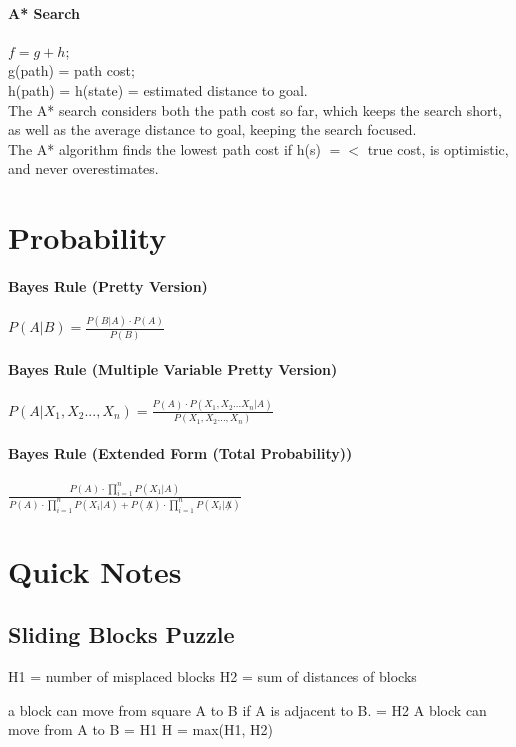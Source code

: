 \documentclass[11pt,letterpaper]{article}
\begin{document}
\paragraph{A* Search}
$f = g + h$; \\ 
g(path) = path cost; \\
h(path) = h(state) = estimated distance to goal. \\
The A* search considers both the path cost so far, which keeps the search short, as well as the average distance to goal, keeping the search focused. \\
The A* algorithm finds the lowest path cost if h(s) $=<$ true cost, is optimistic, and never overestimates.



\section{Probability}

\paragraph{Bayes Rule (Pretty Version)}
$P(A|B) = \frac{P(B|A)\cdot P(A)}{P(B)}$

\paragraph{Bayes Rule (Multiple Variable Pretty Version)}
$ P(A|X_{1},X_{2}...,X_{n}) = \frac{P(A)\cdot P(X_{1},X_{2}...X_{n}|A)}{P(X_{1},X_{2}...,X_{n})}      $

\paragraph{Bayes Rule (Extended Form (Total Probability))}
$\frac{P(A) \cdot \prod_{i=1}^{n} P(X_{1}|A)}{P(A) \cdot \prod_{i=1}^{n} P(X_{i}|A)+P(\not A) \cdot \prod_{i=1}^{n} P(X_{i}|\not A)}$ \\


\section{Quick Notes}
\subsection{Sliding Blocks Puzzle}
H1 = number of misplaced blocks
H2 = sum of distances of blocks

a block can move from square A to B if A is adjacent to B. = H2
A block can move from A to B = H1
H = max(H1, H2)
\end{document}
